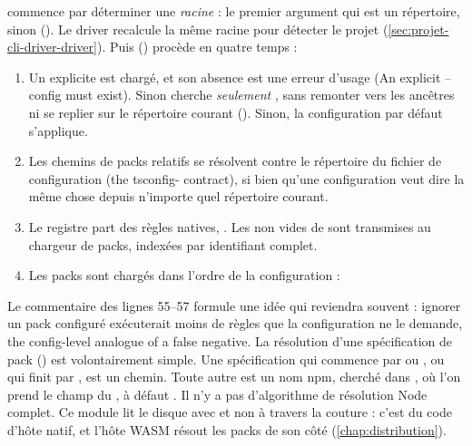  commence par déterminer une \emph{racine} : le premier argument qui est un répertoire, sinon  (). Le driver recalcule la même racine pour détecter le projet (\cref{sec:projet-cli-driver-driver}). Puis  () procède en quatre temps :
\begin{enumerate}
  \item Un  explicite est chargé, et son absence est une erreur d'usage (\og An explicit --config must exist\fg{}). Sinon  cherche \emph{seulement} , sans remonter vers les ancêtres ni se replier sur le répertoire courant (). Sinon, la configuration par défaut s'applique.
  \item Les chemins de packs relatifs se résolvent contre le répertoire du fichier de configuration (\og the tsconfig- contract\fg{}), si bien qu'une configuration veut dire la même chose depuis n'importe quel répertoire courant.
  \item Le registre part des règles natives, . Les  non vides de  sont transmises au chargeur de packs, indexées par identifiant complet.
  \item Les packs sont chargés dans l'ordre de la configuration :
\end{enumerate}


Le commentaire des lignes 55--57 formule une idée qui reviendra souvent : ignorer un pack configuré exécuterait moins de règles que la configuration ne le demande, \og the config-level analogue of a false negative\fg{}. La résolution d'une spécification de pack () est volontairement simple. Une spécification qui commence par  ou \code{/}, ou qui finit par , est un chemin. Toute autre est un nom npm, cherché dans , où l'on prend le champ  du , à défaut . Il n'y a pas d'algorithme de résolution Node complet. Ce module lit le disque avec  et non à travers la couture  : c'est du code d'hôte natif, et l'hôte WASM résout les packs de son côté (\cref{chap:distribution}).


